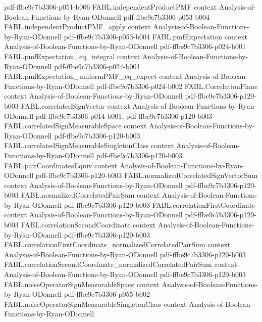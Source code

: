 \begin{theorem}
  {pdf-ffbe9c7b3306-p051-b006}
\proofstep
  {FABL.independentProductPMF}
  {context}
  {Analysis-of-Boolean-Functions-by-Ryan-ODonnell}
  {pdf-ffbe9c7b3306-p053-b004}
\proofstep
  {FABL.independentProductPMF_apply}
  {context}
  {Analysis-of-Boolean-Functions-by-Ryan-ODonnell}
  {pdf-ffbe9c7b3306-p053-b004}
\proofstep
  {FABL.pmfExpectation}
  {context}
  {Analysis-of-Boolean-Functions-by-Ryan-ODonnell}
  {pdf-ffbe9c7b3306-p024-b001}
\proofstep
  {FABL.pmfExpectation_eq_integral}
  {context}
  {Analysis-of-Boolean-Functions-by-Ryan-ODonnell}
  {pdf-ffbe9c7b3306-p024-b001}
\proofstep
  {FABL.pmfExpectation_uniformPMF_eq_expect}
  {context}
  {Analysis-of-Boolean-Functions-by-Ryan-ODonnell}
  {pdf-ffbe9c7b3306-p024-b002}
\proofstep
  {FABL.CorrelationPlane}
  {context}
  {Analysis-of-Boolean-Functions-by-Ryan-ODonnell}
  {pdf-ffbe9c7b3306-p120-b003}
\proofstep
  {FABL.correlatedSignVector}
  {context}
  {Analysis-of-Boolean-Functions-by-Ryan-ODonnell}
  {pdf-ffbe9c7b3306-p014-b001,
    pdf-ffbe9c7b3306-p120-b003}
\proofstep
  {FABL.correlatedSignMeasurableSpace}
  {context}
  {Analysis-of-Boolean-Functions-by-Ryan-ODonnell}
  {pdf-ffbe9c7b3306-p120-b003}
\proofstep
  {FABL.correlatedSignMeasurableSingletonClass}
  {context}
  {Analysis-of-Boolean-Functions-by-Ryan-ODonnell}
  {pdf-ffbe9c7b3306-p120-b003}
\proofstep
  {FABL.pairCoordinatesEquiv}
  {context}
  {Analysis-of-Boolean-Functions-by-Ryan-ODonnell}
  {pdf-ffbe9c7b3306-p120-b003}
\proofstep
  {FABL.normalizedCorrelatedSignVectorSum}
  {context}
  {Analysis-of-Boolean-Functions-by-Ryan-ODonnell}
  {pdf-ffbe9c7b3306-p120-b003}
\proofstep
  {FABL.normalizedCorrelatedPairSum}
  {context}
  {Analysis-of-Boolean-Functions-by-Ryan-ODonnell}
  {pdf-ffbe9c7b3306-p120-b003}
\proofstep
  {FABL.correlationFirstCoordinate}
  {context}
  {Analysis-of-Boolean-Functions-by-Ryan-ODonnell}
  {pdf-ffbe9c7b3306-p120-b003}
\proofstep
  {FABL.correlationSecondCoordinate}
  {context}
  {Analysis-of-Boolean-Functions-by-Ryan-ODonnell}
  {pdf-ffbe9c7b3306-p120-b003}
\proofstep
  {FABL.correlationFirstCoordinate_normalizedCorrelatedPairSum}
  {context}
  {Analysis-of-Boolean-Functions-by-Ryan-ODonnell}
  {pdf-ffbe9c7b3306-p120-b003}
\proofstep
  {FABL.correlationSecondCoordinate_normalizedCorrelatedPairSum}
  {context}
  {Analysis-of-Boolean-Functions-by-Ryan-ODonnell}
  {pdf-ffbe9c7b3306-p120-b003}
\proofstep
  {FABL.noiseOperatorSignMeasurableSpace}
  {context}
  {Analysis-of-Boolean-Functions-by-Ryan-ODonnell}
  {pdf-ffbe9c7b3306-p055-b002}
\proofstep
  {FABL.noiseOperatorSignMeasurableSingletonClass}
  {context}
  {Analysis-of-Boolean-Functions-by-Ryan-ODonnell}

\end{theorem}
